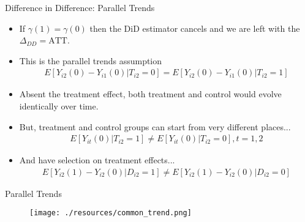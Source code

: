 \begin{frame}{Difference in Difference: Parallel Trends}
\small
\begin{itemize}
\item If $\gamma(1) = \gamma(0)$ then the DiD estimator cancels and we are left with the $\Delta_{DD} = \text{ATT}$.
\item This is the \alert{parallel trends assumption}
\begin{align*}
E\left[Y_{i2}(0) - Y_{i1}(0) | T_{i2}=0 \right] = E\left[Y_{i2}(0) - Y_{i1}(0) | T_{i2}=1 \right]
\end{align*}
\item Absent the treatment effect, both treatment and control would evolve identically over time.
\item But, treatment and control groups can start from very different places...
\begin{align*}
E\left[Y_{i t}(0) | T_{i 2}=1\right] \neq E\left[Y_{i t}(0) | T_{i 2}=0\right], t=1,2
\end{align*}
\item And have selection on treatment effects...
\begin{align*}
E\left[Y_{i 2}(1)-Y_{i 2}(0) | D_{i 2}=1\right] \neq E\left[Y_{i 2}(1)-Y_{i 2}(0) | D_{i 2}=0\right]
\end{align*}
\end{itemize}
\end{frame}


\begin{frame}{Parallel Trends}
\begin{figure}
\centering
\texttt{[image: ./resources/common\_trend.png]}
\end{figure}
\end{frame}



